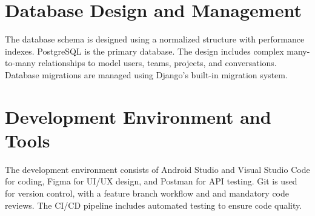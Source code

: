 \section{Database Design and Management}
The database schema is designed using a normalized structure with performance indexes. PostgreSQL is the primary database. The design includes complex many-to-many relationships to model users, teams, projects, and conversations. Database migrations are managed using Django's built-in migration system.

\section{Development Environment and Tools}
The development environment consists of Android Studio and Visual Studio Code for coding, Figma for UI/UX design, and Postman for API testing. Git is used for version control, with a feature branch workflow and and mandatory code reviews. The CI/CD pipeline includes automated testing to ensure code quality.
